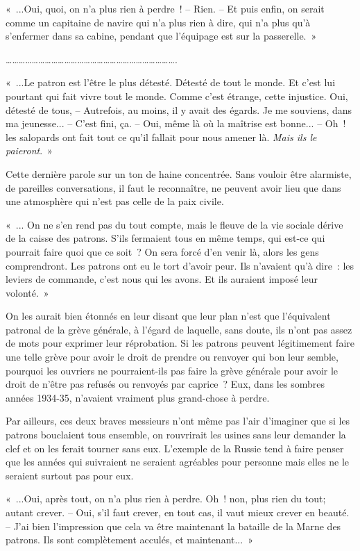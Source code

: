 \documentclass[french,twoside]{book} %
\begin{document}
« ...Oui, quoi, on n'a plus rien à perdre ! – Rien. – Et puis enfin, on serait comme un capitaine de navire qui n'a plus rien à dire, qui n'a plus qu'à s'enfermer dans sa cabine, pendant que l'équipage est sur la passerelle. »\par
…………………………………………………………………….\par
« ...Le patron est l’être le plus détesté. Détesté de tout le monde. Et c'est lui pourtant qui fait vivre tout le monde. Comme c'est étrange, cette injustice. Oui, détesté de tous, – Autrefois, au moins, il y avait des égards. Je me souviens, dans ma jeunesse... – C'est fini, ça. – Oui, même là où la maîtrise est bonne... – Oh ! les salopards ont fait tout ce qu'il fallait pour nous amener là. {\itshape Mais ils le paieront}. »\par
Cette dernière parole sur un ton de haine concentrée. Sans vouloir être alarmiste, de pareilles conversations, il faut le reconnaître, ne peuvent avoir lieu que dans une atmosphère qui n'est pas celle de la paix civile.\par
« ... On ne s'en rend pas du tout compte, mais le fleuve de la vie sociale dérive de la caisse des patrons. S'ils fermaient tous en même temps, qui est-ce qui pourrait faire quoi que ce soit ? On sera forcé d'en venir là, alors les gens comprendront. Les patrons ont eu le tort d'avoir peur. Ils n'avaient qu'à dire : les leviers de commande, c'est nous qui les avons. Et ils auraient imposé leur volonté. »\par
On les aurait bien étonnés en leur disant que leur plan n'est que l'équivalent patronal de la grève générale, à l'égard de laquelle, sans doute, ils n'ont pas assez de mots pour exprimer leur réprobation. Si les patrons peuvent légitimement faire une telle grève pour avoir le droit de prendre ou renvoyer qui bon leur semble, pourquoi les ouvriers ne pourraient-ils pas faire la grève générale pour avoir le droit de n'être pas refusés ou renvoyés par caprice ? Eux, dans les sombres années 1934-35, n'avaient vraiment plus grand-chose à perdre.\par
Par ailleurs, ces deux braves messieurs n'ont même pas l'air d'imaginer que si les patrons bouclaient tous ensemble, on rouvrirait les usines sans leur demander la clef et on les ferait tourner sans eux. L'exemple de la Russie tend à faire penser que les années qui suivraient ne seraient agréables pour personne mais elles ne le seraient surtout pas pour eux.\par
\par
« ...Oui, après tout, on n'a plus rien à perdre. Oh ! non, plus rien du tout; autant crever. – Oui, s'il faut crever, en tout cas, il vaut mieux crever en beauté. – J'ai bien l'impression que cela va être maintenant la bataille de la Marne des patrons. Ils sont complètement acculés, et maintenant... »\par
\end{document}
